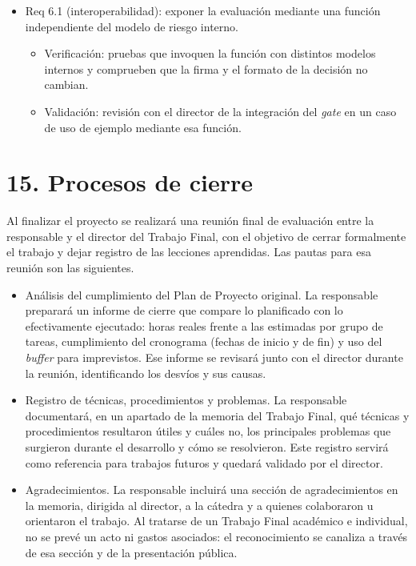 \documentclass[
11pt, %
]{charter}
\begin{document}
\begin{itemize}
\item Req 6.1 (interoperabilidad): exponer la evaluación mediante una función independiente del modelo de riesgo interno.
	\begin{itemize}
		\item Verificación: pruebas que invoquen la función con distintos modelos internos y comprueben que la firma y el formato de la decisión no cambian.
		\item Validación: revisión con el director de la integración del \textit{gate} en un caso de uso de ejemplo mediante esa función.
	\end{itemize}
\end{itemize}

\section{15. Procesos de cierre}    
\label{sec:cierre}

Al finalizar el proyecto se realizará una reunión final de evaluación entre la responsable y el director del Trabajo Final, con el objetivo de cerrar formalmente el trabajo y dejar registro de las lecciones aprendidas. Las pautas para esa reunión son las siguientes.

\begin{itemize}
	\item Análisis del cumplimiento del Plan de Proyecto original. La responsable preparará un informe de cierre que compare lo planificado con lo efectivamente ejecutado: horas reales frente a las estimadas por grupo de tareas, cumplimiento del cronograma (fechas de inicio y de fin) y uso del \textit{buffer} para imprevistos. Ese informe se revisará junto con el director durante la reunión, identificando los desvíos y sus causas.
	\item Registro de técnicas, procedimientos y problemas. La responsable documentará, en un apartado de la memoria del Trabajo Final, qué técnicas y procedimientos resultaron útiles y cuáles no, los principales problemas que surgieron durante el desarrollo y cómo se resolvieron. Este registro servirá como referencia para trabajos futuros y quedará validado por el director.
	\item Agradecimientos. La responsable incluirá una sección de agradecimientos en la memoria, dirigida al director, a la cátedra y a quienes colaboraron u orientaron el trabajo. Al tratarse de un Trabajo Final académico e individual, no se prevé un acto ni gastos asociados: el reconocimiento se canaliza a través de esa sección y de la presentación pública.
\end{itemize}
\end{document}
